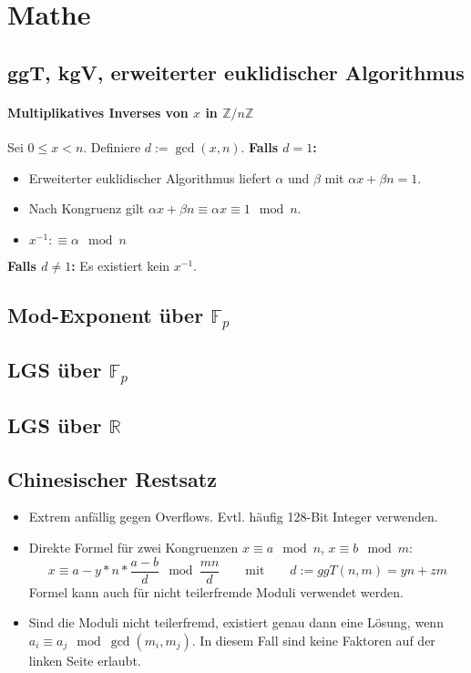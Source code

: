 \section{Mathe}

\subsection{ggT, kgV, erweiterter euklidischer Algorithmus}



\paragraph{Multiplikatives Inverses von $x$ in $\mathbb{Z}/n\mathbb{Z}$}
Sei $0 \leq x < n$. Definiere $d := \gcd(x, n)$.\newline
\textbf{Falls $d = 1$:}
\begin{itemize}[nosep]
	\item Erweiterter euklidischer Algorithmus liefert $\alpha$ und $\beta$ mit
	$\alpha x + \beta n = 1$.
	\item Nach Kongruenz gilt $\alpha x + \beta n \equiv \alpha x \equiv 1 \mod n$.
	\item $x^{-1} :\equiv \alpha \mod n$
	\end{itemize}
\textbf{Falls $d \neq 1$:} Es existiert kein $x^{-1}$.


\subsection{Mod-Exponent über $\mathbb{F}_p$}


\subsection{LGS über $\mathbb{F}_p$}


\subsection{LGS über $\mathbb{R}$}


\subsection{Chinesischer Restsatz}
\begin{itemize}
	\item Extrem anfällig gegen Overflows. Evtl. häufig 128-Bit Integer verwenden.
	\item Direkte Formel für zwei Kongruenzen $x \equiv a \mod n$, $x \equiv b \mod m$:
		\[
			x \equiv a - y * n * \frac{a - b}{d} \mod \frac{mn}{d}
			\qquad \text{mit} \qquad
			d := ggT(n, m) = yn + zm
		\]
		Formel kann auch für nicht teilerfremde Moduli verwendet werden.
	\item Sind die Moduli nicht teilerfremd, existiert genau dann eine Lösung,
	wenn $a_i \equiv a_j \mod \gcd(m_i, m_j)$. In diesem Fall sind keine Faktoren
	auf der linken Seite erlaubt.
\end{itemize}


